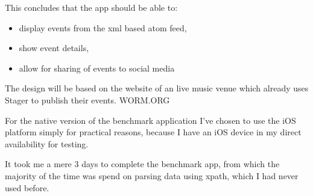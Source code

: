 This concludes that the app should be able to:
\begin{itemize}
	\item display events from the xml based atom feed,
	\item show event details,
	\item allow for sharing of events to social media
\end{itemize}
The design will be based on the website of an live music venue which already uses Stager to publish their events. WORM.ORG

For the native version of the benchmark application I've chosen to use the iOS platform simply for practical reasons, because I have an iOS device in my direct availability for testing.

It took me a mere 3 days to complete the benchmark app, from which the majority of the time was spend on parsing data using xpath, which I had never used before.
